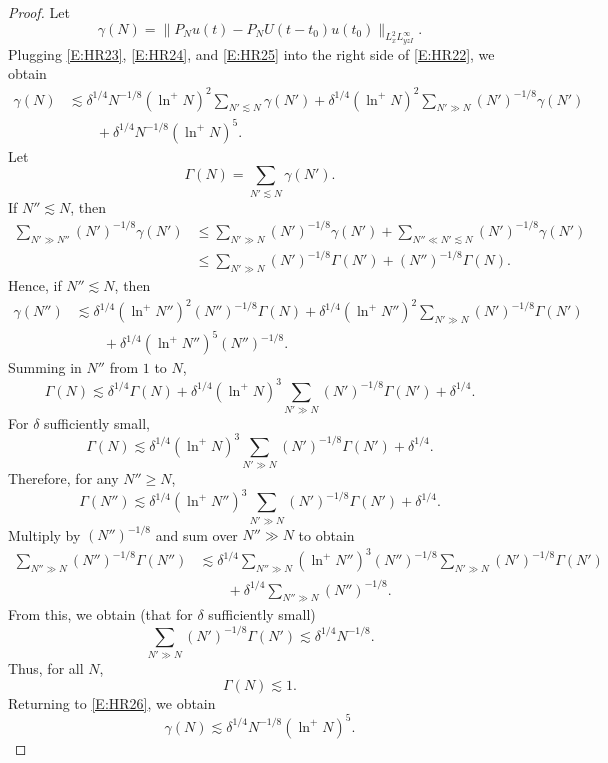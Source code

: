 \documentclass[12pt,letterpaper]{amsart}
\theoremstyle{remark}
\numberwithin{equation}{section}
\numberwithin{theorem}{section}
\numberwithin{table}{section}
\begin{document}
\begin{proof}
Let
$$
\gamma(N) = \|P_Nu(t)-P_NU(t-t_0)u(t_0)\|_{L_x^2L_{yz I}^\infty}.
$$
Plugging \eqref{E:HR23}, \eqref{E:HR24}, and \eqref{E:HR25} into the right side of \eqref{E:HR22}, we obtain
\begin{equation}
\label{E:HR26}
\begin{aligned}
\gamma(N) & \lesssim \delta^{1/4} N^{-1/8} (\ln^+ N)^2 \sum_{N' \lesssim N}\gamma(N') + \delta^{1/4} (\ln^+ N)^2 \sum_{N' \gg N} (N')^{-1/8} \gamma(N') \\
& \qquad + \delta^{1/4} N^{-1/8} (\ln^+ N)^5.
\end{aligned}
\end{equation}
Let 
$$\Gamma(N) = \sum_{N' \lesssim N} \gamma(N').$$
If $N'' \lesssim N$, then
\begin{align*}
\sum_{N' \gg N''} (N')^{-1/8} \gamma(N') 
&\leq \sum_{N' \gg N} (N')^{-1/8} \gamma(N') + \sum_{N'' \ll N' \lesssim N} (N')^{-1/8} \gamma(N') \\
&\leq \sum_{N' \gg N} (N')^{-1/8} \Gamma(N') + (N'')^{-1/8} \Gamma(N).
\end{align*}
Hence, if $N'' \lesssim N$, then
\begin{align*}
\gamma(N'') &\lesssim \delta^{1/4} (\ln^+ N'')^2 (N'')^{-1/8} \Gamma(N) + \delta^{1/4} (\ln^+ N'')^2 \sum_{N'\gg N} (N')^{-1/8} \Gamma(N') \\
& \qquad + \delta^{1/4} (\ln^+ N'')^5 (N'')^{-1/8}.
\end{align*}
Summing in $N''$ from $1$ to $N$,
$$
\Gamma(N) \lesssim \delta^{1/4} \Gamma(N) + \delta^{1/4} (\ln^+ N)^3\sum_{N'\gg N} (N')^{-1/8} \Gamma(N') + \delta^{1/4}.
$$
For $\delta$ sufficiently small,
$$
\Gamma(N) \lesssim  \delta^{1/4}(\ln^+ N)^3 \sum_{N'\gg N} (N')^{-1/8} \Gamma(N') + \delta^{1/4}.
$$
Therefore, for any $N'' \geq N$,
$$
\Gamma(N'') \lesssim  \delta^{1/4}(\ln^+ N'')^3 \sum_{N'\gg N} (N')^{-1/8} \Gamma(N') + \delta^{1/4}.
$$
Multiply by $(N'')^{-1/8}$ and sum over $N'' \gg N$ to obtain 
\begin{align*}
\sum_{N'' \gg N} (N'')^{-1/8} \Gamma(N'') &\lesssim \delta^{1/4}\sum_{N''\gg N} (\ln^+ N'')^3 (N'')^{-1/8} \sum_{N'\gg N} (N')^{-1/8} \Gamma(N') \\
&\qquad + \delta^{1/4} \sum_{N'' \gg N} (N'')^{-1/8}.
\end{align*}
From this, we obtain (that for $\delta$ sufficiently small)
$$
\sum_{N'\gg N} (N')^{-1/8} \Gamma(N') \lesssim \delta^{1/4}N^{-1/8}.
$$
Thus, for all $N$, 
$$
\Gamma(N) \lesssim 1.
$$
Returning to \eqref{E:HR26}, we obtain
$$
\gamma(N) \lesssim \delta^{1/4} N^{-1/8} (\ln^+ N)^5.
$$
\end{proof}
\end{document}
